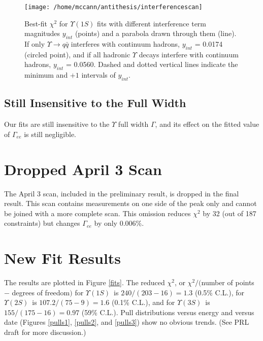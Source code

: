 \documentclass[12pt]{article}
\begin{document}
\begin{figure}
\texttt{[image: /home/mccann/antithesis/interferencescan]}
\caption{\label{intscan} Best-fit $\chi^2$ for $\Upsilon(1S)$ fits
  with different interference term magnitudes $y_{int}$ (points) and a
  parabola drawn through them (line).  If only $\Upsilon \to q\bar{q}$
  interferes with continuum hadrons, $y_{int}$ = 0.0174 (circled
  point), and if all hadronic $\Upsilon$ decays interfere with
  continuum hadrons, $y_{int}$ = 0.0560.  Dashed and dotted vertical
  lines indicate the minimum and $+1$ intervals of $y_{int}$.}
\end{figure}

\subsection{Still Insensitive to the Full Width}

Our fits are still insensitive to the $\Upsilon$ full width $\Gamma$,
and its effect on the fitted value of $\Gamma_{ee}$ is still
negligible.

\section{Dropped April 3 Scan}

The April 3 scan, included in the preliminary result, is dropped in
the final result.  This scan contains measurements on one side of the
peak only and cannot be joined with a more complete scan.  This
omission reduces $\chi^2$ by 32 (out of 187 constraints) but changes
$\Gamma_{ee}$ by only 0.006\%.

\section{New Fit Results}

\newcommand{\us}{$\Upsilon(1S)$}
\newcommand{\uss}{$\Upsilon(2S)$}
\newcommand{\usss}{$\Upsilon(3S)$}
\newcommand{\chired}{\chi^2_{\mbox{\scriptsize red}}}

The results are plotted in Figure \ref{fits}.  The reduced $\chi^2$,
or $\chi^2/($number of points $-$ degrees of freedom$)$ for \us\ is
$240/(203-16) = 1.3$ (0.5\% C.L.), for \uss\ is $107.2/(75-9) = 1.6$
(0.1\% C.L.), and for \usss\ is $155/(175-16) = 0.97$ (59\% C.L.).
Pull distributions versus energy and versus date (Figures
\ref{pulls1}, \ref{pulls2}, and \ref{pulls3}) show no obvious trends.
(See PRL draft for more discussion.)
\end{document}
